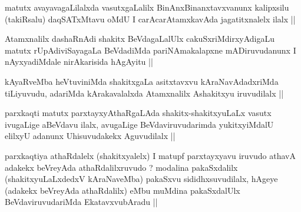 \begin{artha}
matutx avayavagaLilalxda vasutxgaLalilx BinAnxBinanxtavxvanunx
kalipxsilu (takiRsalu) daqSATxMtavu oMdU I carAcarAtamxkavAda
jagatitxnalelx ilalx ||
\end{artha}

\begin{artha}
Atamxnalilx dashaRnAdi shakitx BeVdagaLalUlx cakuSxriMdirxyAdigaLu
matutx rUpAdiviSayagaLa BeVdadiMda pariNAmakalapxne mADiruvudanunx I
nAyxyadiMdale nirAkarisida hAgAyitu ||
\end{artha}


\begin{artha}
kAyaRveMba heVtuviniMda shakitxgaLa asitxtavxvu kAraNavAdadxriMda
tiLiyuvudu, adariMda kArakavalalxda Atamxnalilx Ashakitxyu iruvudilalx ||
\end{artha}


\begin{artha}
parxkaqti matutx parxtayxyAthaRgaLAda
shakitx-shakitxyuLaLx vasutx ivugaLige aBeVdavu ilalx, avugaLige
BeVdaviruvudarimda yukitxyiMdalU elilxyU adanunx Uhisuvudakekx
Aguvudilalx ||
\end{artha}


\begin{artha}
parxkaqtiya athaRdalelx (shakitxyalelx) I matupf parxtayxyavu iruvudo
athavA adakekx beVreyAda athaRdalilxruvudo ? modalina pakaSxdalilx
(shakitxyuLaLxdedxV kAraNaveMba) pakaSxvu sididhxsuvudilalx, hAgeye
(adakekx beVreyAda athaRdalilx) eMbu muMdina pakaSxdalUlx
BeVdaviruvudariMda EkatavxvubAradu ||
\end{artha}


